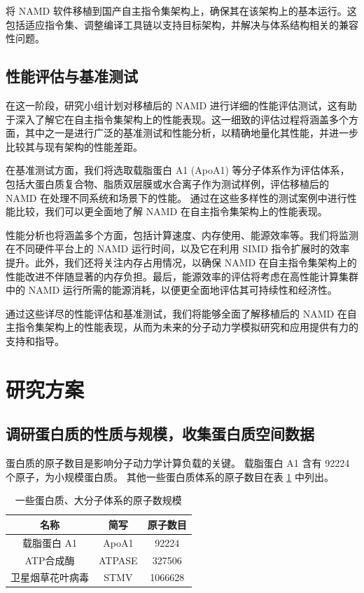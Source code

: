将 NAMD 软件移植到国产自主指令集架构上，确保其在该架构上的基本运行。这包括适应指令集、调整编译工具链以支持目标架构，并解决与体系结构相关的兼容性问题。

\subsection{性能评估与基准测试}


在这一阶段，研究小组计划对移植后的 NAMD 进行详细的性能评估测试，这有助于深入了解它在自主指令集架构上的性能表现。这一细致的评估过程将涵盖多个方面，其中之一是进行广泛的基准测试和性能分析，以精确地量化其性能，并进一步比较其与现有架构的性能差距。

在基准测试方面，我们将选取载脂蛋白 A1 (ApoA1) 等分子体系作为评估体系，包括大蛋白质复合物、脂质双层膜或水合离子作为测试样例，评估移植后的 NAMD 在处理不同系统和场景下的性能。
通过在这些多样性的测试案例中进行性能比较，我们可以更全面地了解 NAMD 在自主指令集架构上的性能表现。

性能分析也将涵盖多个方面，包括计算速度、内存使用、能源效率等。我们将监测在不同硬件平台上的 NAMD 运行时间，以及它在利用 SIMD 指令扩展时的效率提升。此外，我们还将关注内存占用情况，以确保 NAMD 在自主指令集架构上的性能改进不伴随显著的内存负担。最后，能源效率的评估将考虑在高性能计算集群中的 NAMD 运行所需的能源消耗，以便更全面地评估其可持续性和经济性。

通过这些详尽的性能评估和基准测试，我们将能够全面了解移植后的 NAMD 在自主指令集架构上的性能表现，从而为未来的分子动力学模拟研究和应用提供有力的支持和指导。

\section{研究方案}

\subsection{调研蛋白质的性质与规模，收集蛋白质空间数据}

蛋白质的原子数目是影响分子动力学计算负载的关键。
载脂蛋白 A1 含有 92224 个原子，为小规模蛋白质。
其他一些蛋白质体系的原子数目在表 \ref{tab:protein-size} 中列出。

\begin{table}[h]
    \centering
    \caption{一些蛋白质、大分子体系的原子数规模}
    \label{tab:protein-size}
    \begin{tabular}{ccc}
        \toprule
        名称       & 简写     & 原子数目    \\
        \midrule
        载脂蛋白 A1  & ApoA1  & 92224   \\
        ATP合成酶   & ATPASE & 327506  \\
        卫星烟草花叶病毒 & STMV   & 1066628 \\
        \bottomrule
    \end{tabular}
\end{table}

